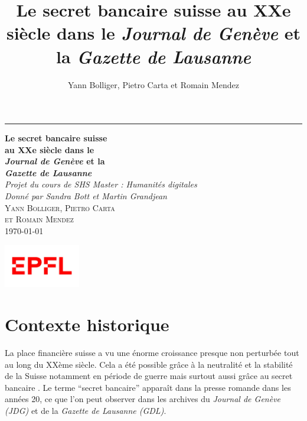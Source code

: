 \documentclass[a4paper, 11pt]{article}
\title{
   Le secret bancaire suisse au XXe siècle dans le
  \textit{Journal de Genève} et la \textit{Gazette de Lausanne}
}
\author{Yann Bolliger, Pietro Carta et Romain Mendez}
\begin{document}
  

\begin{titlepage} 
	\raggedleft %
	
	\rule{1pt}{\textheight} %
	\hspace{0.05\textwidth} %
	\parbox[b]{0.75\textwidth}{ %
		
		{\Huge\bfseries 
		  Le secret bancaire suisse \\[0.4\baselineskip]
		   au XXe siècle dans le \\[0.4\baselineskip]
          \textit{Journal de Genève} et la \\[0.4\baselineskip]
          \textit{Gazette de Lausanne}
		}\\[2\baselineskip] 
		
		\textit{\large
		  Projet du cours de SHS Master : Humanités digitales \\
		  Donné par Sandra Bott et Martin Grandjean
		}\\[4\baselineskip] 
		
		\textsc{\Large
		    Yann Bolliger, Pietro Carta \\ et Romain Mendez
		}\\[2\baselineskip] 
		
		{\today }
		
		\vspace{0.35\textheight} %
		
		{\noindent 
		  \includegraphics[width=0.25\textwidth]{logo.png}
		}
	}

\end{titlepage}
  

\section{Contexte historique}

La place financière suisse a vu une énorme croissance presque non perturbée tout
au long du XXème siècle. Cela a été possible grâce à la neutralité et la
stabilité de la Suisse notamment en période de guerre mais surtout aussi grâce
au  secret bancaire \citep[p. 512]{Mazbouri12}. 
Le terme ``secret bancaire'' apparaît dans la presse romande dans les années 20,
ce que l'on peut observer dans les archives du \textit{Journal de Genève (JDG)} et 
de la \textit{Gazette de Lausanne (GDL)}.
\end{document}
